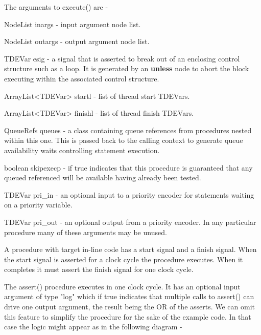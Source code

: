         The arguments to execute() are -
        \blist
        \item   NodeList            inargs - input argument node list.
        \item   NodeList            outargs - output argument node list.
        \item   TDEVar              esig - a signal that is asserted to break out of an enclosing
                                    control structure such as a loop. It is generated by an {\bf unless} node
                                    to abort the block executing within the associated control structure.
        \item   ArrayList<TDEVar>   startl - list of thread start TDEVars.
        \item   ArrayList<TDEVar>   finishl - list of thread finish TDEVars.
        \item   QueueRefs           queues - a class containing queue references from procedures nested within
                                    this one. This is passed back to the calling context to generate queue
                                    availability waits controlling statement execution.
        \item   boolean             skipexecp - if true indicates that this procedure is guaranteed that any
                                    queued referenced will be available having already been tested.
        \item   TDEVar              pri\_in - an optional input to a priority encoder for statements waiting
                                    on a priority variable.
        \item   TDEVar              pri\_out - an optional output from a priority encoder.
        \blend
        In any particular procedure many of these arguments may be unused.
        
        A procedure with target in-line code has a start signal and a finish signal. When the start
        signal is asserted for a clock cycle the procedure executes. When it completes it must
        assert the finish signal for one clock cycle.
        
        The assert() procedure executes in one clock cycle. It has an optional input argument of type "log"
        which if true indicates that multiple calls to assert() can drive one output argument, the result being
        the OR of the asserts. We can omit this feature to simplify the procedure for the sake of the example
        code. In that case the logic might appear as in the following diagram -


